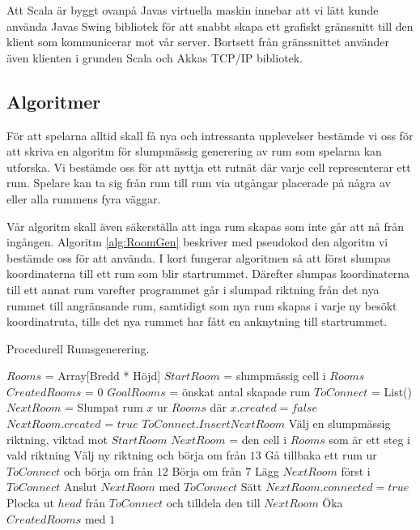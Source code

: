 \documentclass[a4paper]{article}
\begin{document}
Att Scala är byggt ovanpå Javas virtuella maskin innebar att vi lätt kunde använda Javas Swing bibliotek för att snabbt skapa
ett grafiskt gränssnitt till den klient som kommunicerar mot vår server. Bortsett från gränssnittet använder även klienten i
grunden Scala och Akkas TCP/IP bibliotek.

\subsection{Algoritmer}
För att spelarna alltid skall få  nya och intressanta upplevelser bestämde vi oss för att skriva en algoritm för slumpmässig generering av rum som spelarna kan utforska. Vi
bestämde oss för att nyttja ett rutnät där varje cell representerar ett rum. Spelare kan ta sig från rum till rum via utgångar placerade på några av eller alla rummens fyra väggar.

Vår algoritm skall även säkerställa att inga rum skapas som inte går att nå från ingången. Algoritm \ref{alg:RoomGen} beskriver med pseudokod den algoritm vi bestämde oss för att använda. 
I kort fungerar algoritmen så att först slumpas koordinaterna till ett rum som blir startrummet. 
Därefter slumpas koordinaterna till ett annat rum varefter programmet går i slumpad riktning från det nya rummet 
till angränsande rum, samtidigt som nya rum skapas i varje ny besökt koordinatruta, tills det nya rummet har fått 
en anknytning till startrummet.

\begin{algorithm}
\caption{Procedurell Rumsgenerering.}
\label{alg:RoomGen}
\begin{algorithmic}[1]
\State  $Rooms$ = Array[Bredd * Höjd]
\State  $StartRoom$ = slumpmässig cell i $Rooms$
\State  $CreatedRooms$ = $0$
\State  $GoalRooms$ = önskat antal skapade rum
\Repeat
\State $ToConnect$ = List()
\State $NextRoom$  =  Slumpat rum $x$ ur $Rooms$ där $x.created = false$
\State $NextRoom.created$ = $true$
\State $ToConnect.Insert NextRoom$
\State Välj en slumpmässig riktning, viktad mot $StartRoom$
\State $NextRoom$ = den cell i $Rooms$ som är ett steg i vald riktning
\State Välj ny riktning och börja om från $13$
\State Gå tillbaka ett rum ur $ToConnect$ och börja om från $12$
\State Börja om från $7$
\EndIf
\EndIf
{}
\State Lägg $NextRoom$ först i $ToConnect$
\EndIf
\EndWhile
{}
\State Anslut $NextRoom$ med $ToConnect$
\State Sätt $NextRoom.connected = true$
\State Plocka ut $head$ från $ToConnect$ och tilldela den till $NextRoom$
\State Öka $CreatedRooms$ med $1$
\EndWhile
{}
\EndFunction
\end{algorithmic}
\end{algorithm}
\end{document}
